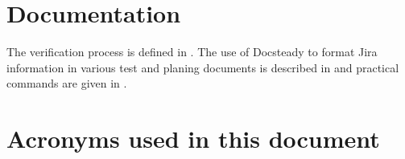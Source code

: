 

\newpage
\appendix
\section{Documentation}
The verification process is defined in .
The use of Docsteady to format Jira information in various test and planing documents is
described in  and practical commands are given in .

\section{Acronyms used in this document}\label{sec:acronyms}


\newpage

%
